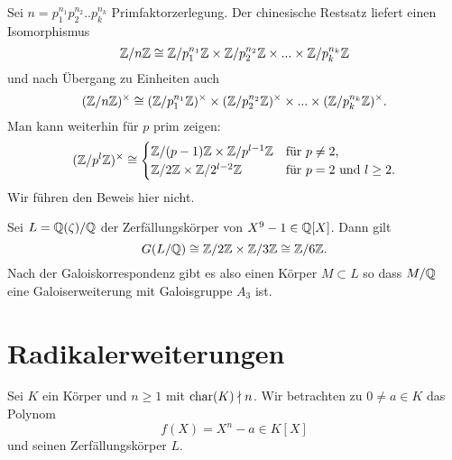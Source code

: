 \documentclass{book}
\begin{document}
\begin{rem}
    \label{rem:rest}
    Sei $n = p_1^{n_1} p_2^{n_2} .. p_k^{n_k}$ Primfaktorzerlegung. Der chinesische Restsatz liefert einen Isomorphismus 
    \[
        \mathbb{Z}/n\mathbb{Z} \cong \mathbb{Z}/p_1^{n_1}\mathbb{Z} \times \mathbb{Z}/p_2^{n_2}\mathbb{Z} \times ... \times  \mathbb{Z}/p_k^{n_k}\mathbb{Z}
    \]
    und nach Übergang zu Einheiten auch 
    \[
        (\mathbb{Z}/n\mathbb{Z})^{\times} \cong (\mathbb{Z}/p_1^{n_1}\mathbb{Z})^{\times} \times (\mathbb{Z}/p_2^{n_2}\mathbb{Z})^{\times} \times ... \times  (\mathbb{Z}/p_k^{n_k}\mathbb{Z})^{\times}.
    \]
    Man kann weiterhin für $p$ prim zeigen:
    \[
        (\mathbb{Z}/p^l\mathbb{Z})^{\times} \cong \begin{cases} \mathbb{Z}/(p-1)\mathbb{Z} \times \mathbb{Z}/p^{l-1}\mathbb{Z} & \text{für $p \ne 2$,}\\
        \mathbb{Z}/2\mathbb{Z} \times \mathbb{Z}/2^{l-2}\mathbb{Z} & \text{für $p = 2$ und $l \ge 2$.} \end{cases}
    \]
    Wir führen den Beweis hier nicht. 
\end{rem}

\begin{exa}
    \label{exa:kreis}
    Sei $L = \mathbb{Q}(\zeta)/\mathbb{Q}$ der Zerfällungskörper von $X^9 -1 \in \mathbb{Q}[X]$. Dann gilt
    \[
        G(L/\mathbb{Q}) \cong \mathbb{Z}/2\mathbb{Z} \times \mathbb{Z}/3\mathbb{Z} \cong \mathbb{Z}/6\mathbb{Z}.
    \]
    Nach der Galoiskorrespondenz gibt es also einen Körper $M \subset L$ so
    dass $M/\mathbb{Q}$ eine Galoiserweiterung mit Galoisgruppe $A_3$ ist. 
\end{exa}

\section{Radikalerweiterungen}%
\label{sec:radikalpolynome}


Sei $K$ ein Körper und $n \ge 1$ mit $\operatorname{char}(K) \nmid n$. Wir betrachten zu $0
\ne a \in K$ das Polynom
\[
    f(X) = X^n - a \in K[X]
\]
und seinen Zerfällungskörper $L$. 
\end{document}
